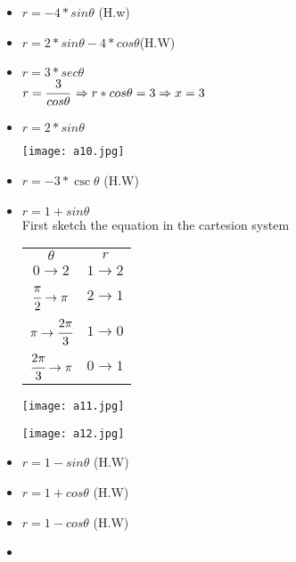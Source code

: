\begin{example}
\begin{itemize}
\begin{minipage}{0.5\textwidth}
\end{minipage}
\item $r=-4*sin\theta$ (H.w)
\item $r=2*sin\theta-4*cos\theta$(H.W)
\item $r=3*sec\theta$\\ $r=\cfrac{3}{cos\theta}$ $\Rightarrow r*cos\theta =3\\ \Rightarrow x=3$
\item 
\begin{minipage}{0.6\textwidth}
$r=2*sin\theta$
\end{minipage}
\begin{minipage}{0.5\textwidth}
\texttt{[image: a10.jpg]}\\
\end{minipage}
\item $r=-3*\csc\theta$ (H.W)
\item $r=1+sin\theta$\\First sketch the equation in the cartesion system \\
\begin{minipage}{0.32\textwidth}
	\begin{tabular}{ |c | c |  }
	\hline
	$\theta$ & $r$ \\
{\color{red}$0 \rightarrow 2$} & {\color{red} $1 \rightarrow 2$} \\
{\color{red} $\cfrac{\pi}{2} \rightarrow \pi $} & {\color{red}$2 \rightarrow 1$} \\
{\color{red}$\pi \rightarrow \cfrac{2\pi}{3}$} & {\color{red}$1 \rightarrow 0$}\\
{\color{red}$\cfrac{2\pi}{3}\rightarrow \pi $ } & {\color{red}$0 \rightarrow 1$}
	\end{tabular}
\end{minipage}
\begin{minipage}{0.32\textwidth}
\texttt{[image: a11.jpg]}
\end{minipage}
\begin{minipage}{0.32\textwidth}
\texttt{[image: a12.jpg]}
\end{minipage}
\item $r=1-sin\theta$ (H.W)
\item $r=1+cos\theta$ (H.W)
\item $r=1-cos\theta$ (H.W)
\item \begin{minipage}{0.6\textwidth}

\end{minipage}
\end{itemize}
\end{example}
